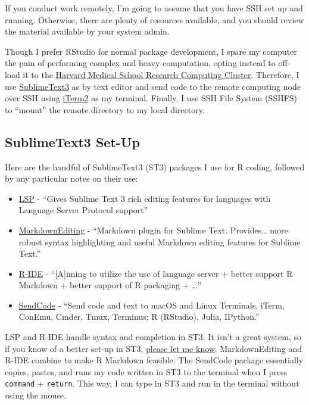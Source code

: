 \documentclass[]{book}
\providecommand{\tightlist}{%
  \setlength{\itemsep}{0pt}\setlength{\parskip}{0pt}}
\begin{document}
If you conduct work remotely, I'm going to assume that you have SSH set up and running. Otherwise, there are plenty of resources available, and you should review the material available by your system admin.

Though I prefer RStudio for normal package development, I spare my computer the pain of performing complex and heavy computation, opting instead to off-load it to the \href{https://rc.hms.harvard.edu}{Harvard Medical School Research Computing Cluster}. Therefore, I use \href{https://www.sublimetext.com}{SublimeText3} as by text editor and send code to the remote computing node over SSH using \href{https://iterm2colorschemes.com}{iTerm2} as my terminal. Finally, I use SSH File System (SSHFS) to ``mount'' the remote directory to my local directory.

\hypertarget{sublimetext3-set-up}{%
\subsection{SublimeText3 Set-Up}\label{sublimetext3-set-up}}

Here are the handful of SublimeText3 (ST3) packages I use for R coding, followed by any particular notes on their use:

\begin{itemize}
\tightlist
\item
  \href{https://packagecontrol.io/packages/LSP}{LSP} - ``Gives Sublime Text 3 rich editing features for languages with Language Server Protocol support''
\item
  \href{https://packagecontrol.io/packages/MarkdownEditing}{MarkdownEditing} - ``Markdown plugin for Sublime Text. Provides\ldots{} more robust syntax highlighting and useful Markdown editing features for Sublime Text.''
\item
  \href{https://packagecontrol.io/packages/R-IDE}{R-IDE} - ``{[}A{]}iming to utilize the use of language server + better support R Markdown + better support of R packaging + \ldots{}''
\item
  \href{https://packagecontrol.io/packages/SendCode}{SendCode} - ``Send code and text to macOS and Linux Terminals, iTerm, ConEmu, Cmder, Tmux, Terminus; R (RStudio), Julia, IPython.''
\end{itemize}

LSP and R-IDE handle syntax and completion in ST3. It isn't a great system, so if you know of a better set-up in ST3, \href{https://github.com/jhrcook/package-as-analysis/issues}{please let me know}. MarkdownEditing and R-IDE combine to make R Markdown feasible. The SendCode package essentially copies, pastes, and runs my code written in ST3 to the terminal when I press \texttt{command} + \texttt{return}. This way, I can type in ST3 and run in the terminal without using the mouse.
\end{document}
